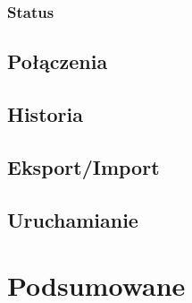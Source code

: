 \documentclass[a4paper,10pt]{article}
\begin{document}
\subsubsection{Status}

\subsection{Połączenia}
\subsection{Historia}
\subsection{Eksport/Import}
\subsection{Uruchamianie}
\section{Podsumowane}
\end{document}

